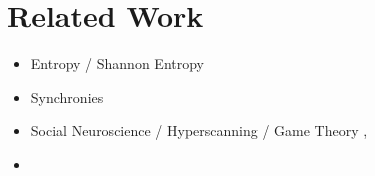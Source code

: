 \section*{Related Work}

\begin{itemize}
  \item Entropy / Shannon Entropy
  \item Synchronies \cite{stevens2009canneuro}
  \item Social Neuroscience / Hyperscanning / Game Theory \cite{fallani2010defecting}, \cite{stevens2010identification}
  \item 
\end{itemize}